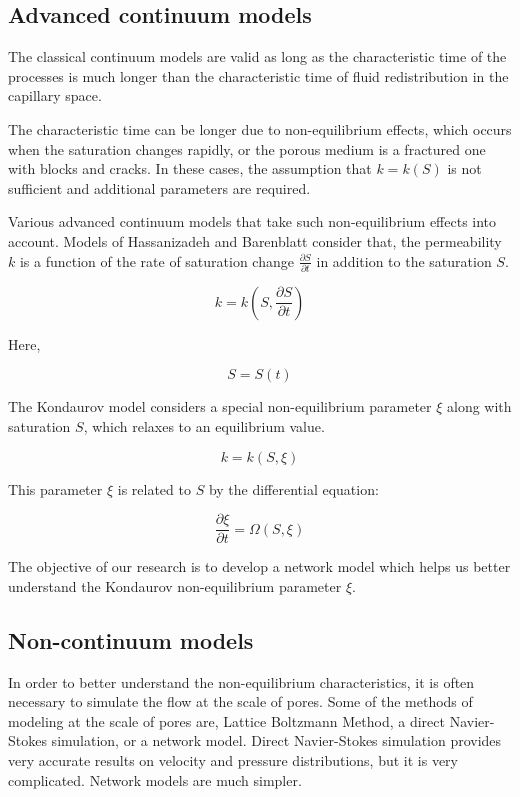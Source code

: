 \subsection{Advanced continuum models}
	The classical continuum models are valid as long as the characteristic time of the processes is much longer than the characteristic time of fluid redistribution in the capillary space.
	
	The characteristic time can be longer due to non-equilibrium effects, which occurs when the saturation changes rapidly, or the porous medium is a fractured one with blocks and cracks. In these cases, the assumption that $k = k(S)$ is not sufficient and additional parameters are required.

	Various advanced continuum models that take such non-equilibrium effects into account. Models of Hassanizadeh \cite{hassanizadeh2004continuum} \cite{hassanizadeh1987high} and Barenblatt \cite{barenblatt1960basic} consider that, the permeability $k$ is a function of the rate of saturation change $\frac{\partial S}{\partial t}$ in addition to the saturation $S$.                  
	
	\begin{equation}
		k = k(S, \frac{\partial S}{\partial t})
	\end{equation}
	
	Here,
	
	\begin{equation}
		S = S(t)
	\end{equation}
	
	The Kondaurov model \cite{kondaurov2009non} considers a special non-equilibrium parameter $\xi$ along with saturation $S$, which relaxes to an equilibrium value. \cite{kondaurov2007thermodynamically}
	
	\begin{equation}
		k = k(S, \xi)
	\end{equation}
	
	This parameter $\xi$ is related to $S$ by the differential equation:
	
	\begin{equation}
		\frac{\partial \xi}{\partial t} = \Omega ( S, \xi )
	\end{equation}
	
	The objective of our research is to develop a network model which helps us better understand the Kondaurov non-equilibrium parameter $\xi$.
	 
\subsection{Non-continuum models}
	In order to better understand the non-equilibrium characteristics, it is often necessary to simulate the flow at the scale of pores. Some of the methods of modeling at the scale of pores are, Lattice Boltzmann Method, a direct Navier-Stokes simulation, or a network model. Direct Navier-Stokes simulation provides very accurate results on velocity and pressure distributions, but it is very complicated. Network models are much simpler.
	
